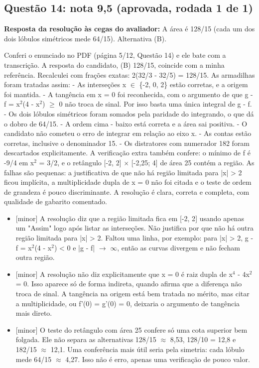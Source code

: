\documentclass{article}%
\begin{document}
\subsection*{Questão 14: nota 9,5 (aprovada, rodada 1 de 1)}%
\textbf{Resposta da resolução às cegas do avaliador:} A área é 128/15 (cada um dos dois lóbulos simétricos mede 64/15). Alternativa (B).\par %
Conferi o enunciado no PDF (página 5/12, Questão 14) e ele bate com a transcrição. A resposta do candidato, (B) 128/15, coincide com a minha referência. Recalculei com frações exatas: 2(32/3 - 32/5) = 128/15. As armadilhas foram tratadas assim:\newline%
{-} As interseções x $\in$ \{-2, 0, 2\} estão corretas, e a origem foi mantida.\newline%
{-} A tangência em x = 0 foi reconhecida, com o argumento de que g - f = x$^2$(4 - x$^2$) $\geq$ 0 não troca de sinal. Por isso basta uma única integral de g - f.\newline%
{-} Os dois lóbulos simétricos foram somados pela paridade do integrando, o que dá o dobro de 64/15.\newline%
{-} A ordem cima - baixo está correta e a área sai positiva.\newline%
{-} O candidato não cometeu o erro de integrar em relação ao eixo x.\newline%
{-} As contas estão corretas, inclusive o denominador 15.\newline%
{-} Os distratores com numerador 182 foram descartados explicitamente.\newline%
\newline%
A verificação extra também confere: o mínimo de f é -9/4 em x$^2$ = 3/2, e o retângulo {[}-2, 2{]} $\times$ {[}-2,25; 4{]} de área 25 contém a região. As falhas são pequenas: a justificativa de que não há região limitada para |x| > 2 ficou implícita, a multiplicidade dupla de x = 0 não foi citada e o teste de ordem de grandeza é pouco discriminante. A resolução é clara, correta e completa, com qualidade de gabarito comentado.%
\begin{itemize}%
\item%
{[}minor{]} A resolução diz que a região limitada fica em {[}-2, 2{]} usando apenas um "Assim" logo após listar as interseções. Não justifica por que não há outra região limitada para |x| > 2. Faltou uma linha, por exemplo: para |x| > 2, g - f = x$^2$(4 - x$^2$) < 0 e |g - f| $\to$ $\infty$, então as curvas divergem e não fecham outra região.%
\item%
{[}minor{]} A resolução não diz explicitamente que x = 0 é raiz dupla de x$^{4}$ - 4x$^2$ = 0. Isso aparece só de forma indireta, quando afirma que a diferença não troca de sinal. A tangência na origem está bem tratada no mérito, mas citar a multiplicidade, ou f'(0) = g'(0) = 0, deixaria o argumento de tangência mais direto.%
\item%
{[}minor{]} O teste do retângulo com área 25 confere só uma cota superior bem folgada. Ele não separa as alternativas 128/15 $\approx$ 8,53, 128/10 = 12,8 e 182/15 $\approx$ 12,1. Uma conferência mais útil seria pela simetria: cada lóbulo mede 64/15 $\approx$ 4,27. Isso não é erro, apenas uma verificação de pouco valor.%
\end{itemize}%
\end{document}
